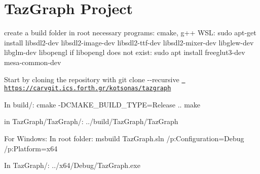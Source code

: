 \chapter{Taz\+Graph Project}
\hypertarget{index}{}\label{index}
\label{index_md__2mnt_2c_2Users_2lefte_2Mujin_2MastersThesis_2Taz_2TazGraph_2README}%
%
 create a build folder in root necessary programs\+: cmake, g++ WSL\+: {\ttfamily sudo apt-\/get install libsdl2-\/dev libsdl2-\/image-\/dev libsdl2-\/ttf-\/dev libsdl2-\/mixer-\/dev libglew-\/dev libglm-\/dev libopengl} if libopengl does not exist\+: {\ttfamily sudo apt install freeglut3-\/dev mesa-\/common-\/dev}

Start by cloning the repository with {\ttfamily git clone -\/-\/recursive \href{https://carvgit.ics.forth.gr/kotsonas/tazgraph}{\texttt{ https\+://carvgit.\+ics.\+forth.\+gr/kotsonas/tazgraph}}}

In build/\+: {\ttfamily cmake -\/DCMAKE\+\_\+\+BUILD\+\_\+\+TYPE=Release ..} {\ttfamily make}

in Taz\+Graph/\+Taz\+Graph/\+: {\ttfamily ../build/\+Taz\+Graph/\+Taz\+Graph}

For Windows\+: In root folder\+: {\ttfamily msbuild Taz\+Graph.\+sln /p\+:Configuration=Debug /p\+:Platform=x64}

In Taz\+Graph/\+: {\ttfamily ../x64/\+Debug/\+Taz\+Graph.exe} 
